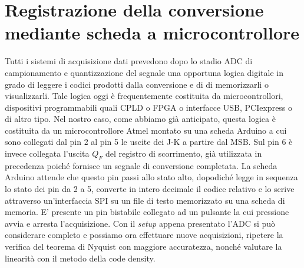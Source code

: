 \documentclass[journal]{IEEEtran}
\begin{document}
\section{Registrazione della conversione mediante scheda a microcontrollore}
Tutti i sistemi di acquisizione dati prevedono dopo lo stadio ADC di campionamento e quantizzazione del segnale una opportuna logica digitale in grado di leggere i codici prodotti dalla conversione e di di memorizzarli o visualizzarli. Tale logica oggi è frequentemente costituita da microcontrollori, dispositivi programmabili quali CPLD o FPGA o interfacce USB, PCIexpress o di altro tipo. Nel nostro caso, come abbiamo già anticipato, questa logica è costituita da un microcontrollore Atmel montato su una scheda Arduino a cui sono collegati dal pin 2 al pin 5 le uscite dei J-K a partire dal MSB. Sul pin 6 è invece collegata l'uscita $Q_F$ del registro di scorrimento, già utilizzata in precedenza poiché fornisce un segnale di conversione completata. La scheda Arduino attende che questo pin passi allo stato alto, dopodiché legge in sequenza lo stato dei pin da 2 a 5, converte in intero decimale il codice relativo e lo scrive attraverso un'interfaccia SPI su un file di testo memorizzato su una scheda di memoria. E' presente un pin bistabile collegato ad un pulsante la cui pressione avvia e arresta l'acquisizione. Con il \textit{setup} appena presentato l'ADC si può considerare completo e possiamo ora effettuare nuove acquisizioni, ripetere la verifica del teorema di Nyquist con maggiore accuratezza, nonché valutare la linearità con il metodo della code density.
\end{document}

